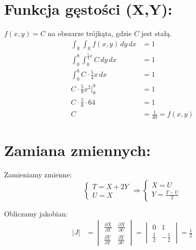 \documentclass[12pt]{article}
\begin{document}
\vspace{1.5cm}

\section*{Funkcja gęstości (X,Y):}

$f(x,y) = C$ na obszarze trójkąta, gdzie $C$ jest stałą. \\

\begin{align*}
    \int_\mathbb{R}  \int_\mathbb{R}  f(x, y) \, dy \, dx &= 1 \\
    \int_0^8 \int_0^{\frac{5}{4}x} C \, dy \, dx &= 1 \\
    \int_0^8 C \cdot \frac{5}{4}x \, dx &= 1 \\
    C \cdot \frac{5}{8}x^2 \bigg|_0^8 &= 1 \\
    C \cdot \frac{5}{8} \cdot 64 &= 1 \\
    C &= \frac{1}{40} = f(x,y)
\end{align*}

\section*{Zamiana zmiennych:}
Zamieniamy zmienne: \\
\begin{equation*}
    \begin{cases}
        T = X + 2Y \\
        U = X
    \end{cases}
    \Rightarrow 
    \begin{cases}
        X = U \\
        Y = \frac{T - U}{2}
    \end{cases}
\end{equation*}

Obliczamy jakobian: \\
\begin{align*}
    |J| &= \begin{vmatrix}
        \frac{\partial X}{\partial T} & \frac{\partial X}{\partial U} \\
        \frac{\partial Y}{\partial T} & \frac{\partial Y}{\partial U}
    \end{vmatrix} = 
    \begin{vmatrix}
        0 & 1 \\
        \frac{1}{2} & -\frac{1}{2}
    \end{vmatrix} = \frac{1}{2}
\end{align*}
\end{document}
